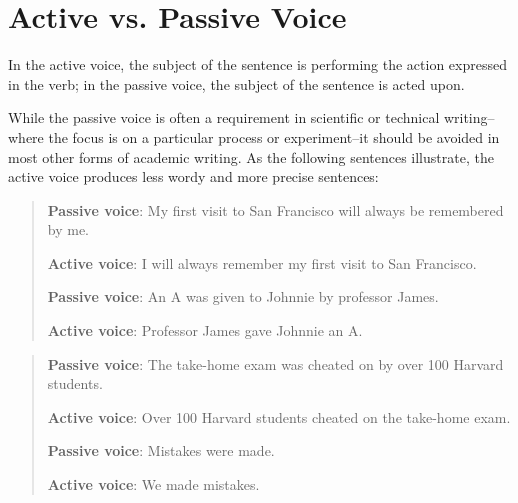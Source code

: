 
\chapter{Active vs. Passive Voice}

In the active voice, the subject of the sentence is performing the action expressed in 
the verb; in the passive voice, the subject of the sentence is acted upon. 

While the passive voice is often a requirement in scientific or technical writing--where 
the focus is on a particular process or experiment--it should be avoided in most other 
forms of academic writing. As the following sentences illustrate, the active voice 
produces less wordy and more precise sentences:

\begin{quote}
 
\textbf{Passive voice}: My first visit to San Francisco will always be remembered by me.

\textbf{Active voice}: I will always remember my first visit to San Francisco.

\textbf{Passive voice}: 	An A was given to Johnnie by professor James.

\textbf{Active voice}: 	Professor James gave Johnnie an A.
\end{quote}

\begin{quote}
\textbf{Passive voice}: The take-home exam was cheated on by over 100 Harvard 
students.

\textbf{Active voice}: Over 100 Harvard students cheated on the take-home exam.

\textbf{Passive voice}: Mistakes were made.

\textbf{Active voice}: We made mistakes.

\end{quote}

